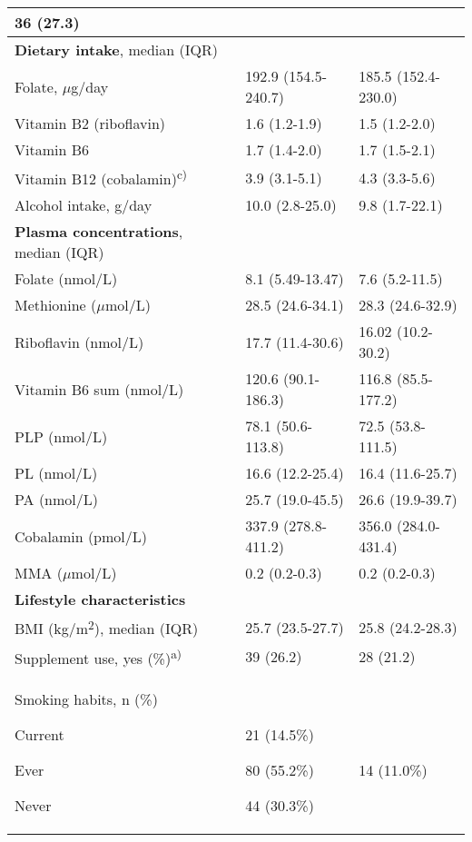 \begin{flushleft}
\begin{supertabular}{m{5.5cm}m{3.5cm}m{3cm}}
 36 (27.3)\\\hline
 \textbf{Dietary intake}, median (IQR)
&
~
 &
~
\\\hline
 Folate, \textrm{${\mu}$}g/day &
 192.9 (154.5-240.7) &
 185.5 (152.4-230.0)\\\hline
 Vitamin B2 (riboflavin) &
 1.6 (1.2-1.9) &
 1.5 (1.2-2.0)\\\hline
 Vitamin B6 &
 1.7 (1.4-2.0) &
 1.7 (1.5-2.1)\\\hline
 Vitamin B12
(cobalamin)\textsuperscript{c)} &
 3.9 (3.1-5.1) &
 4.3 (3.3-5.6)\\\hline
 Alcohol intake, g/day &
 10.0 (2.8-25.0) &
 9.8 (1.7-22.1)\\\hline
 \textbf{Plasma concentrations}, median
(IQR) &
~
 &
~
\\\hline
 Folate (nmol/L) &
 8.1 (5.49-13.47) &
 7.6 (5.2-11.5)\\\hline
 Methionine (\textrm{${\mu}$}mol/L) &
 28.5 (24.6-34.1) &
 28.3 (24.6-32.9)\\\hline
 Riboflavin (nmol/L) &
 17.7 (11.4-30.6) &
 16.02 (10.2-30.2)\\\hline
 Vitamin B6 sum (nmol/L) &
 120.6 (90.1-186.3) &
 116.8 (85.5-177.2)\\\hline
 PLP (nmol/L) &
 78.1 (50.6-113.8) &
 72.5 (53.8-111.5)\\\hline
 PL (nmol/L) &
 16.6 (12.2-25.4) &
 16.4 (11.6-25.7)\\\hline
 PA (nmol/L) &
 25.7 (19.0-45.5) &
 26.6 (19.9-39.7)\\\hline
 Cobalamin (pmol/L) &
 337.9 (278.8-411.2) &
 356.0 (284.0-431.4)\\\hline
{MMA
(}\textrm{${\mu}$}{mol/L)} &
 0.2 (0.2-0.3) &
{0.2
(0.2-0.3})\\\hline
\bfseries Lifestyle characteristics &
~
 &
~
\\\hline
{BMI
(kg/m}{\textsuperscript{2}}{),
median (IQR)} &
 25.7 (23.5-27.7) &
 25.8 (24.2-28.3)\\\hline
 Supplement use, yes
(\%)\textsuperscript{a)} &
 39 (26.2) &
 28 (21.2)\\\hline
{ Smoking habits, n (\%)}

{ Current}

{ Ever}

 Never &
~

{ 21 (14.5\%)}

{ 80 (55.2\%)}

 44 (30.3\%) &
~

{ 14 (11.0\%)}


\end{supertabular}
\end{flushleft}
